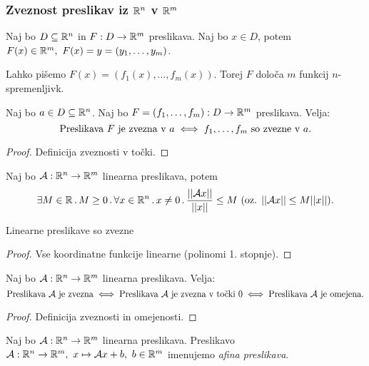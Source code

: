 \newpage
\subsubsection{Zveznost preslikav iz $\mathbb{R}^n$ v $\mathbb{R}^m$}
Naj bo $D \subseteq \mathbb{R}^n$ in $F: D \to \mathbb{R}^m$ preslikava. Naj bo $x \in D$, potem $F(x) \in \mathbb{R}^m, \ F(x) = y = (y_1, \ldots, y_m)$.

Lahko pišemo $F(x) = (f_1(x), \ldots, f_m(x))$. Torej $F$ določa $m$ funkcij $n$-spremenljivk.

\begin{trditev}
    Naj bo $a \in D \subseteq \mathbb{R}^n$. Naj bo $F=(f_1, \ldots, f_m): D \to \mathbb{R}^m$ preslikava. Velja:
    $$\text{Preslikava } F \text{ je zvezna v } a \iff f_1,\ldots, f_m \text{ so zvezne v } a.$$
\end{trditev}

\begin{proof}
    Definicija zveznosti v točki.
\end{proof}

\begin{zgled}
    Naj bo $\mathcal{A}: \mathbb{R}^n \to \mathbb{R}^m$ linearna preslikava, potem $$\exists  M \in \mathbb{R} \, . \, M \geq 0 \,.\, \forall x \in \mathbb{R}^n \, . \, x \neq 0  \,.\,  \frac{||\mathcal{A}x||}{||x||} \leq M \ (\text{oz. } ||\mathcal{A}x|| \leq M ||x|| ).$$
\end{zgled}

\begin{trditev}
    Linearne preslikave so zvezne
\end{trditev}

\begin{proof}
    Vse koordinatne funkcije linearne (polinomi 1. stopnje).
\end{proof}

\begin{trditev}
    Naj bo $\mathcal{A}: \mathbb{R}^n \to \mathbb{R}^m$ linearna preslikava. Velja:
    $$\text{Preslikava } \mathcal{A} \text{ je zvezna} \iff \text{Preslikava } \mathcal{A} \text{ je zvezna v točki } 0 \iff \text{Preslikava } \mathcal{A} \text{ je omejena}.$$
\end{trditev}

\begin{proof}
    Definicija zveznosti in omejenosti.
\end{proof}

\begin{definicija}
    Naj bo $\mathcal{A}: \mathbb{R}^n \to \mathbb{R}^m$ linearna preslikava. Preslikavo $\mathcal{A}: \mathbb{R}^n \to \mathbb{R}^m, \ x \mapsto \mathcal{A}x + b, \ b \in \mathbb{R}^m$ imenujemo \emph{afina preslikava}.
\end{definicija}

